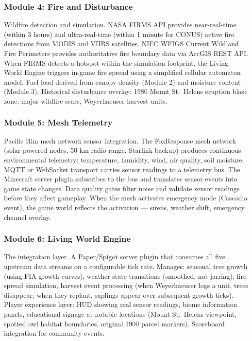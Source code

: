 \documentclass[11pt,letterpaper]{article}
\begin{document}
\subsubsection{Module 4: Fire and Disturbance}
Wildfire detection and simulation. NASA FIRMS API provides near-real-time (within 3 hours) and ultra-real-time (within 1 minute for CONUS) active fire detections from MODIS and VIIRS satellites. NIFC WFIGS Current Wildland Fire Perimeters provides authoritative fire boundary data via ArcGIS REST API. When FIRMS detects a hotspot within the simulation footprint, the Living World Engine triggers in-game fire spread using a simplified cellular automaton model. Fuel load derived from canopy density (Module 2) and moisture content (Module 3). Historical disturbance overlay: 1980 Mount St.\ Helens eruption blast zone, major wildfire scars, Weyerhaeuser harvest units.

\subsubsection{Module 5: Mesh Telemetry}
Pacific Rim mesh network sensor integration. The FoxResponse mesh network (solar-powered nodes, 50 km radio range, Starlink backup) produces continuous environmental telemetry: temperature, humidity, wind, air quality, soil moisture. MQTT or WebSocket transport carries sensor readings to a telemetry bus. The Minecraft server plugin subscribes to the bus and translates sensor events into game state changes. Data quality gates filter noise and validate sensor readings before they affect gameplay. When the mesh activates emergency mode (Cascadia event), the game world reflects the activation --- sirens, weather shift, emergency channel overlay.

\subsubsection{Module 6: Living World Engine}
The integration layer. A Paper/Spigot server plugin that consumes all five upstream data streams on a configurable tick rate. Manages: seasonal tree growth (using FIA growth curves), weather state transitions (smoothed, not jarring), fire spread simulation, harvest event processing (when Weyerhaeuser logs a unit, trees disappear; when they replant, saplings appear over subsequent growth ticks). Player experience layer: HUD showing real sensor readings, biome information panels, educational signage at notable locations (Mount St.\ Helens viewpoint, spotted owl habitat boundaries, original 1900 parcel markers). Scoreboard integration for community events.
\end{document}

